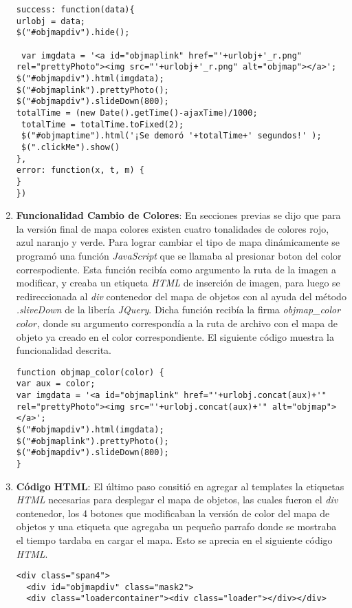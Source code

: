 \begin{enumerate}[label=\alph*) ,font=\bfseries]
\begin{lstlisting}[style=Java, caption={Obtención \textit{WebObjects}.}]
success: function(data){
urlobj = data;
$("#objmapdiv").hide();
  
 var imgdata = '<a id="objmaplink" href="'+urlobj+'_r.png" rel="prettyPhoto"><img src="'+urlobj+'_r.png" alt="objmap"></a>';
$("#objmapdiv").html(imgdata);
$("#objmaplink").prettyPhoto();
$("#objmapdiv").slideDown(800);
totalTime = (new Date().getTime()-ajaxTime)/1000;
 totalTime = totalTime.toFixed(2);
 $("#objmaptime").html('¡Se demoró '+totalTime+' segundos!' );
 $(".clickMe").show()
},
error: function(x, t, m) {
}
})
\end{lstlisting}
\item \textbf{Funcionalidad Cambio de Colores}: En secciones previas se dijo que para la versión 
final de mapa colores existen cuatro tonalidades de colores rojo, azul naranjo y verde. Para lograr
cambiar el tipo de mapa dinámicamente se programó una función \textit{JavaScript} que se llamaba al presionar boton del color correspodiente. Esta función recibía como argumento la ruta de la imagen
a modificar, y creaba un etiqueta \textit{HTML} de inserción de imagen, para luego se redireccionada
al \textit{div} contenedor del mapa de objetos con al ayuda del método \textit{.sliveDown\(\)} de la
libería \textit{JQuery}. Dicha función recibía la firma \textit{objmap_color\(color\)}, donde su 
argumento correspondía a la ruta de archivo con el mapa de objeto ya creado en el color 
correspondiente. El siguiente código muestra la funcionalidad descrita.
\newpage
\begin{lstlisting}[style=Java, caption={Obtención \textit{WebObjects}.}]
function objmap_color(color) {
var aux = color;      
var imgdata = '<a id="objmaplink" href="'+urlobj.concat(aux)+'" rel="prettyPhoto"><img src="'+urlobj.concat(aux)+'" alt="objmap"></a>';
$("#objmapdiv").html(imgdata);
$("#objmaplink").prettyPhoto();
$("#objmapdiv").slideDown(800);
}
\end{lstlisting}
\item \textbf{Código HTML}: El último paso consitió en agregar al templates la etiquetas 
\textit{HTML} necesarias para desplegar el mapa de objetos, las cuales fueron el \textit{div}
contenedor, los 4 botones que modificaban la versión de color del mapa de objetos y una 
etiqueta que agregaba un pequeño parrafo donde se mostraba el tiempo tardaba en cargar el mapa.
Esto se aprecia en el siguiente código \textit{HTML}.
\begin{lstlisting}[style=Java, caption={Obtención \textit{WebObjects}.}]
<div class="span4">
  <div id="objmapdiv" class="mask2">
  <div class="loadercontainer"><div class="loader"></div></div>

\end{lstlisting}
\end{enumerate}
